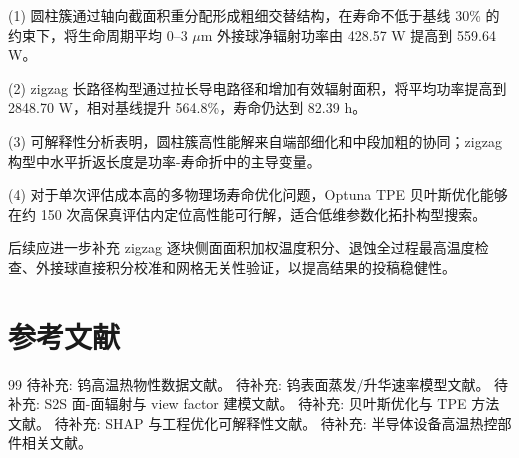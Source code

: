 \documentclass[10pt,twocolumn]{ctexart}
\begin{document}
(1) 圆柱簇通过轴向截面积重分配形成粗细交替结构，在寿命不低于基线 30\% 的约束下，将生命周期平均 0--3 $\mu$m 外接球净辐射功率由 428.57 W 提高到 559.64 W。

(2) zigzag 长路径构型通过拉长导电路径和增加有效辐射面积，将平均功率提高到 2848.70 W，相对基线提升 564.8\%，寿命仍达到 82.39 h。

(3) 可解释性分析表明，圆柱簇高性能解来自端部细化和中段加粗的协同；zigzag 构型中水平折返长度是功率-寿命折中的主导变量。

(4) 对于单次评估成本高的多物理场寿命优化问题，Optuna TPE 贝叶斯优化能够在约 150 次高保真评估内定位高性能可行解，适合低维参数化拓扑构型搜索。

后续应进一步补充 zigzag 逐块侧面面积加权温度积分、退蚀全过程最高温度检查、外接球直接积分校准和网格无关性验证，以提高结果的投稿稳健性。

\section*{参考文献}
\begin{thebibliography}{99}
 待补充: 钨高温热物性数据文献。
 待补充: 钨表面蒸发/升华速率模型文献。
 待补充: S2S 面-面辐射与 view factor 建模文献。
 待补充: 贝叶斯优化与 TPE 方法文献。
 待补充: SHAP 与工程优化可解释性文献。
 待补充: 半导体设备高温热控部件相关文献。
\end{thebibliography}

\balance
\end{document}
